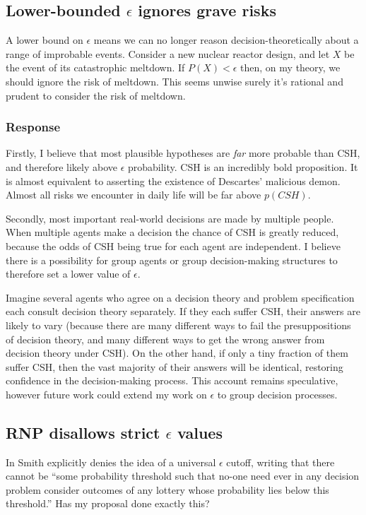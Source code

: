 \documentclass{article}
\begin{document}
\subsection{Lower-bounded \(\epsilon\) ignores grave risks}
A lower bound on \(\epsilon\) means we can no longer reason decision-theoretically about a range of improbable events. Consider a new nuclear reactor design, and let \(X\) be the event of its catastrophic meltdown. If \(P(X) < \epsilon\) then, on my theory, we should ignore the risk of meltdown. This seems unwise \textemdash{} surely it's rational and prudent to consider the risk of meltdown.

\subsubsection*{Response}

Firstly, I believe that most plausible hypotheses are \textit{far} more probable than CSH, and therefore likely above \(\epsilon\) probability. CSH is an incredibly bold proposition. It is almost equivalent to asserting the existence of Descartes' malicious demon. Almost all risks we encounter in daily life will be far above \(p(CSH)\). 

Secondly, most important real-world decisions are made by multiple people. When multiple agents make a decision the chance of CSH is greatly reduced, because the odds of CSH being true for each agent are independent. I believe there is a possibility for group agents or group decision-making structures to therefore set a lower value of \(\epsilon\). 

Imagine several agents who agree on a decision theory and problem specification each consult decision theory separately. If they each suffer CSH, their answers are likely to vary (because there are many different ways to fail the presuppositions of decision theory, and many different ways to get the wrong answer from decision theory under CSH). On the other hand, if only a tiny fraction of them suffer CSH, then the vast majority of their answers will be identical, restoring confidence in the decision-making process. This account remains speculative, however future work could extend my work on \(\epsilon\) to group decision processes.

\subsection{RNP disallows strict \(\epsilon\) values}

In \citep[pg. 476]{smith2014evaluative} Smith explicitly denies the idea of a universal \(\epsilon\) cutoff, writing that there cannot be ``some probability threshold such that no-one need ever \textemdash{} in any decision problem \textemdash{} consider outcomes \textemdash{} of any lottery \textemdash{} whose probability lies below this threshold.'' Has my proposal done exactly this?
\end{document}
